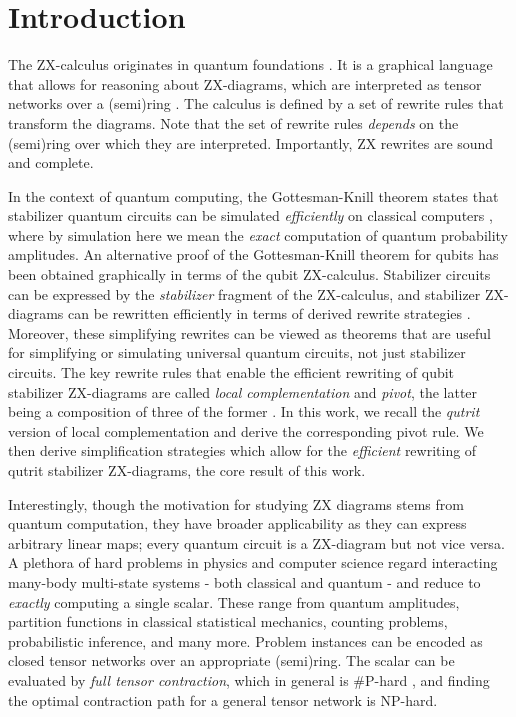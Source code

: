 \section{Introduction}



The ZX-calculus originates in
quantum foundations \cite{Coecke2011,vandewetering2020zxcalculus}.
It is a graphical language that allows for reasoning about ZX-diagrams,
which are interpreted as tensor networks over
a (semi)ring \cite{wang2020completeness}.
The calculus
is defined by a set of rewrite rules
that transform the diagrams.
Note that the set of rewrite rules \emph{depends} on
the (semi)ring over which they are interpreted.
Importantly, ZX rewrites are sound and complete.


In the context of quantum computing,
the Gottesman-Knill theorem states that stabilizer quantum
circuits can be
simulated \emph{efficiently} on classical computers \cite{Aaronson2004},
where by simulation here we mean the \emph{exact} computation of quantum probability amplitudes.
An alternative
proof of the Gottesman-Knill theorem for qubits has been obtained graphically in terms of the qubit ZX-calculus.
Stabilizer circuits can be expressed by the \emph{stabilizer}
fragment of the ZX-calculus,
and stabilizer ZX-diagrams can be rewritten efficiently
in terms of derived rewrite strategies \cite{graph_theoretic_simplification}.
Moreover, these simplifying rewrites can be viewed as theorems
that are useful for simplifying or simulating universal quantum circuits, not just stabilizer circuits.
The key rewrite rules that enable the efficient rewriting
of qubit stabilizer ZX-diagrams
are called \emph{local complementation} and \emph{pivot},
the latter being a composition of three of the former \cite{graph_theoretic_simplification}.
In this work, we recall the \emph{qutrit} version of local complementation \cite{harny_completeness} and derive the corresponding pivot rule.
We then derive simplification strategies
which allow for the \emph{efficient} rewriting of qutrit stabilizer ZX-diagrams,
the core result of this work.

Interestingly, though the motivation for studying ZX diagrams stems from quantum computation, they have broader applicability as they
can express arbitrary linear maps;
every quantum circuit is a ZX-diagram but not vice versa.
A plethora of hard problems in physics and computer science
regard interacting many-body multi-state systems - both classical and quantum -
and reduce to \emph{exactly} computing a single scalar.
These range from quantum amplitudes,
partition functions in classical statistical mechanics,
counting problems, probabilistic inference, and many more.
Problem instances can be encoded as closed
tensor networks over an appropriate (semi)ring.
The scalar can be evaluated by \emph{full tensor contraction},
which in general is \#P-hard \cite{Damm2002},
and finding the optimal contraction path for a general tensor network is NP-hard.



